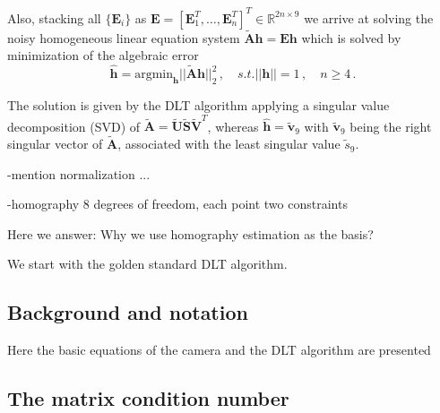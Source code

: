 \documentclass[letterpaper, 10 pt, conference]{ieeeconf}  %
\begin{document}
Also, stacking all $\{\mathbf{E}_i\}$ as $\mathbf{E}=[\mathbf{E}_1^T, \dots, \mathbf{E}_n^T]^T \in \mathbb{R}^{2n \times 9}$ we arrive at solving
the noisy homogeneous linear equation system 
$\tilde{\mathbf{A}}\mathbf{h}=\mathbf{E}\mathbf{h}$ 
which is solved by minimization of the algebraic error
\begin{equation}
\label{Eq5}
 \hat{\mathbf{h}} = \text{argmin}_{\mathbf{h}} 
 |\!|\tilde{\mathbf{A}}\mathbf{h}|\!|_2^2\, , \quad s.t. |\!|\mathbf{h}|\!|=1\,,\quad n \geq 4 \,.
\end{equation} 

The solution is given by the DLT algorithm applying a singular value decomposition (SVD) of 
$\tilde{\mathbf{A}} = \tilde{\mathbf{U}}\tilde{\mathbf{S}}\tilde{\mathbf{V}}^T$,
whereas $\hat{\mathbf{h}}=\tilde{\mathbf{v}}_9$ with $\tilde{\mathbf{v}}_9$ being the 
right singular vector of $\tilde{\mathbf{A}}$, associated with the least singular value $\tilde{s}_9$.

-mention normalization ...

-homography 8 degrees of freedom, each point two constraints

Here we answer: Why we use homography estimation as the basis?

We start with the golden standard DLT algorithm.

\subsection{Background and notation}
Here the basic equations of the camera and the DLT algorithm are presented

\subsection{The matrix condition number}

\end{document}
